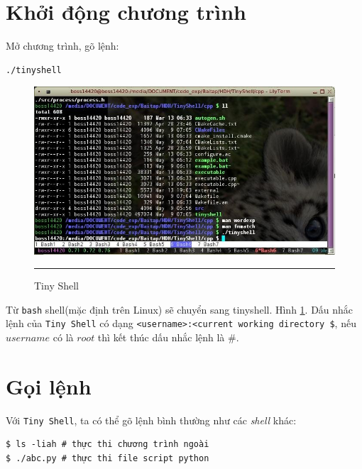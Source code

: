 \documentclass[a4paper,12pt]{report}
\begin{document}
    \section{Khởi động chương trình}
    Mở chương trình, gõ lệnh:
    \begin{verbatim}
./tinyshell
    \end{verbatim}
    \begin{figure}
        \centering
        \includegraphics[scale=0.7]{ts1}
        \rule{35em}{0.5pt}
        \caption{Tiny Shell}
        \label{fig:ts1}
    \end{figure}

    Từ \texttt{bash} shell(mặc định trên Linux) sẽ chuyển sang tinyshell. Hình
    \ref{fig:ts1}. Dấu nhắc lệnh của \texttt{Tiny Shell} có dạng
    \texttt{<username>:<current working directory \$}, nếu $username$ có là $root$ thì
    kết thúc dấu nhắc lệnh là \#.

    \section{Gọi lệnh}
    Với \texttt{Tiny Shell}, ta có thể gõ lệnh bình thường như các
    \textit{shell} khác:
    \begin{verbatim}
$ ls -liah # thực thi chương trình ngoài
$ ./abc.py # thực thi file script python
    \end{verbatim}
\end{document}
